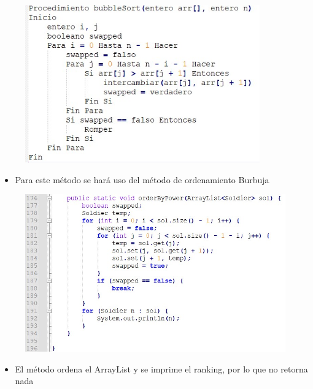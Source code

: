 \documentclass{article}
\begin{document}
	\begin{figure}[H]
		\centering
		\includegraphics[width=0.9\textwidth,keepaspectratio]{img/burbuja.jpg}
	\end{figure}
	
	
	\begin{itemize}	
		\item Para este método se hará uso del método de ordenamiento Burbuja
	\end{itemize}
	
	
	\begin{figure}[H]
		\centering
		\includegraphics[width=1.1\textwidth,keepaspectratio]{img/9.jpg}
	\end{figure}
	
	
	\begin{itemize}	
		\item El método ordena el ArrayList y se imprime el ranking, por lo que no retorna nada
	\end{itemize}
	
\end{document}
